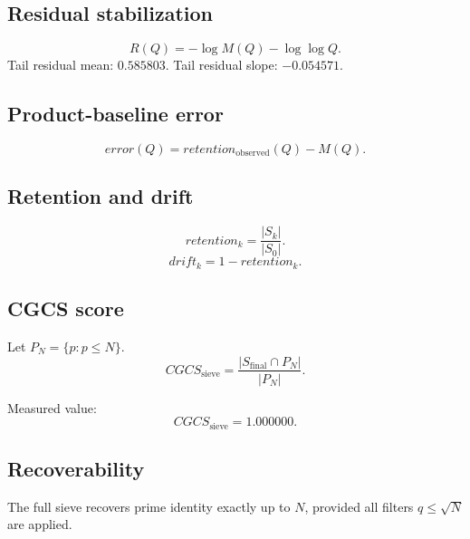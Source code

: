 \documentclass{article}
\begin{document}
\subsection*{Residual stabilization}
\[
R(Q)=-\log M(Q)-\log\log Q.
\]
Tail residual mean: $0.585803$.
Tail residual slope: $-0.054571$.
\subsection*{Product-baseline error}

\[
error(Q) = retention_{\mathrm{observed}}(Q) - M(Q).
\]

\subsection*{Retention and drift}

\[
retention_k = \frac{|S_k|}{|S_0|}.
\]
\[
drift_k = 1 - retention_k.
\]

\subsection*{CGCS score}

Let $P_N = \{p : p \le N\}$.
\[
CGCS_{\mathrm{sieve}} =
\frac{|S_{\mathrm{final}} \cap P_N|}{|P_N|}.
\]

Measured value:
\[
CGCS_{\mathrm{sieve}} = 1.000000.
\]

\subsection*{Recoverability}

The full sieve recovers prime identity exactly up to $N$, provided all filters $q \le \sqrt{N}$ are applied.
\end{document}
